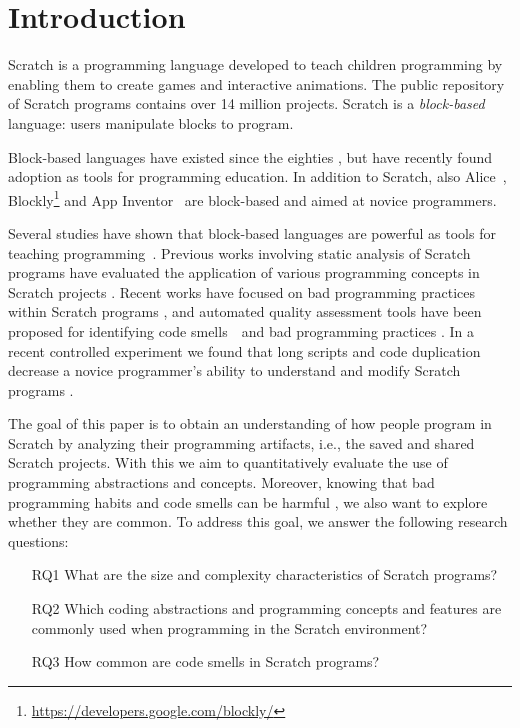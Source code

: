 \documentclass{sig-alternate-05-2015}
\begin{document}

\section{Introduction}

Scratch \cite{resnick_scratch:_2009} is a programming language developed to teach children programming by enabling them to create games and interactive animations. The public repository of Scratch programs contains over 14 million projects. Scratch is a \emph{block-based} language: users manipulate blocks to program.

Block-based languages have existed since the eighties \cite{e._glinert_towards_1986}, but have recently found adoption as tools for programming education. In addition to Scratch, also Alice~\cite{conway_alice:_1994}, Blockly\footnote{\url{https://developers.google.com/blockly/}} and App Inventor~\cite{wolber_app_2011} are block-based and aimed at novice programmers.

Several studies have shown that block-based languages are powerful as tools for teaching programming~\cite{meerbaum-salant_learning_2010, b._moskal_evaluating_2005,cooper_teaching_2003,price_comparing_2015}. Previous works involving static analysis of Scratch programs have evaluated the application of various programming concepts in Scratch projects \cite{Maloney_2008,moreno_automatic_2014}. Recent works have focused on bad programming practices within Scratch programs \cite{Meerbaum_habits_2011}, and automated quality assessment tools have been proposed for identifying code smells~\cite{fowler_refactoring:_1999}~and bad programming practices \cite{boe_hairball:_2013,moreno_automatic_2014}. In a recent controlled experiment we found that long scripts and code duplication decrease a novice programmer's ability to understand and modify Scratch programs \cite{hermans_2016}.

The goal of this paper is to obtain an understanding of how people program in Scratch by analyzing their programming artifacts, i.e., the saved and shared Scratch projects. With this we aim to quantitatively evaluate the use of programming abstractions and concepts. Moreover, knowing that bad programming habits and code smells can be harmful \cite{hermans_2016}, we also want to explore whether they are common. To address this goal, we answer the following research questions:

\begin{itemize}
\item[RQ1] What are the size and complexity characteristics of Scratch programs?
\item[RQ2] Which coding abstractions and programming concepts and features are commonly used when programming in the Scratch environment?
\item[RQ3] How common are code smells in Scratch programs?
\end{itemize}
\end{document}

